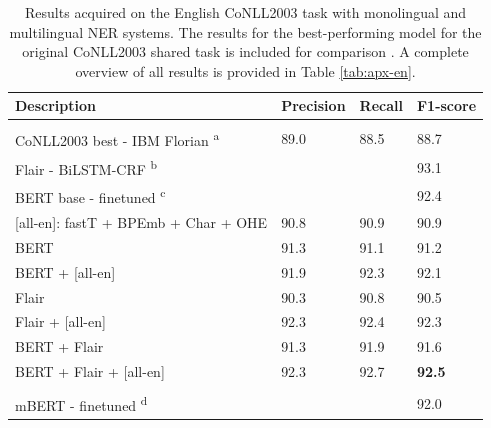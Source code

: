 \documentclass[12pt,a4paper,]{book}
\begin{document}
\begin{table}

\caption{\label{tab:conll2003-tab}Results acquired on the English CoNLL2003 task with monolingual and multilingual NER systems. The results for the best-performing model for the original CoNLL2003 shared task is included for comparison \citep{florian2003}. A complete overview of all results is provided in Table \ref{tab:apx-en}.}
\centering
\begin{tabular}[t]{llll}
\toprule
Description & Precision & Recall & F1-score\\
\midrule
\addlinespace[0.3em]
\multicolumn{4}{l}{\textbf{Monolingual}}\\
\textcolor[HTML]{999999}{\hspace{1em}CoNLL2003 best - IBM Florian \textsuperscript{a}} & \textcolor[HTML]{999999}{89.0} & \textcolor[HTML]{999999}{88.5} & \textcolor[HTML]{999999}{88.7}\\
\textcolor[HTML]{999999}{\hspace{1em}Flair - BiLSTM-CRF \textsuperscript{b}} & \textcolor[HTML]{999999}{} & \textcolor[HTML]{999999}{} & \textcolor[HTML]{999999}{93.1}\\
\textcolor[HTML]{999999}{\hspace{1em}BERT base - finetuned \textsuperscript{c}} & \textcolor[HTML]{999999}{} & \textcolor[HTML]{999999}{} & \textcolor[HTML]{999999}{92.4}\\
\hspace{1em}[all-en]: fastT + BPEmb + Char + OHE & 90.8 & 90.9 & 90.9\\
\hspace{1em}BERT & 91.3 & 91.1 & 91.2\\
\hspace{1em}BERT + [all-en] & 91.9 & 92.3 & 92.1\\
\hspace{1em}Flair & 90.3 & 90.8 & 90.5\\
\hspace{1em}Flair + [all-en] & 92.3 & 92.4 & 92.3\\
\hspace{1em}BERT + Flair & 91.3 & 91.9 & 91.6\\
\hspace{1em}BERT + Flair + [all-en] & 92.3 & 92.7 & \textbf{92.5}\\
\addlinespace[0.3em]
\multicolumn{4}{l}{\textbf{Multilingual}}\\
\textcolor[HTML]{999999}{\hspace{1em}mBERT - finetuned \textsuperscript{d}} & \textcolor[HTML]{999999}{} & \textcolor[HTML]{999999}{} & \textcolor[HTML]{999999}{92.0}\\

\end{tabular}
\end{table}
\end{document}
